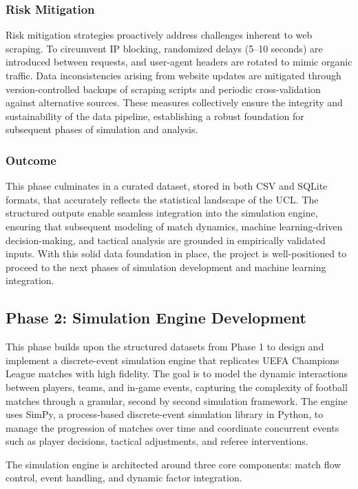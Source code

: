 \documentclass[12pt]{article}
\begin{document}
\subsubsection{Risk Mitigation}
Risk mitigation strategies proactively address challenges inherent to web scraping. To circumvent IP blocking, randomized delays (5--10 seconds) are introduced between requests, and user-agent headers are rotated to mimic organic traffic. Data inconsistencies arising from website updates are mitigated through version-controlled backups of scraping scripts and periodic cross-validation against alternative sources. These measures collectively ensure the integrity and sustainability of the data pipeline, establishing a robust foundation for subsequent phases of simulation and analysis.

\subsubsection{Outcome}
This phase culminates in a curated dataset, stored in both CSV and SQLite formats, that accurately reflects the statistical landscape of the UCL. The structured outputs enable seamless integration into the simulation engine, ensuring that subsequent modeling of match dynamics, machine learning-driven decision-making, and tactical analysis are grounded in empirically validated inputs. With this solid data foundation in place, the project is well-positioned to proceed to the next phases of simulation development and machine learning integration.

\subsection{Phase 2: Simulation Engine Development}
This phase builds upon the structured datasets from Phase 1 to design and implement a discrete-event simulation engine that replicates UEFA Champions League matches with high fidelity. The goal is to model the dynamic interactions between players, teams, and in-game events, capturing the complexity of football matches through a granular, second by second simulation framework. The engine uses SimPy, a process-based discrete-event simulation library in Python, to manage the progression of matches over time and coordinate concurrent events such as player decisions, tactical adjustments, and referee interventions.

The simulation engine is architected around three core components: match flow control, event handling, and dynamic factor integration.
\end{document}

